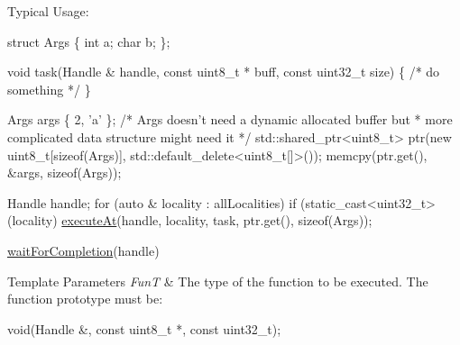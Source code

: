 Typical Usage\-: 
\begin{DoxyCode}
\textcolor{keyword}{struct }Args \{
  \textcolor{keywordtype}{int} a;
  \textcolor{keywordtype}{char} b;
\};

\textcolor{keywordtype}{void} task(Handle & handle,
          \textcolor{keyword}{const} uint8\_t * buff,
          \textcolor{keyword}{const} uint32\_t size) \{  \textcolor{comment}{/* do something */} \}

Args args \{ 2, \textcolor{charliteral}{'a'} \};
\textcolor{comment}{/* Args doesn't need a dynamic allocated buffer but}
\textcolor{comment}{ * more complicated data structure might need it */}
std::shared\_ptr<uint8\_t> ptr(\textcolor{keyword}{new} uint8\_t[\textcolor{keyword}{sizeof}(Args)],
                             std::default\_delete<uint8\_t[]>());
memcpy(ptr.get(), &args, \textcolor{keyword}{sizeof}(Args));

Handle handle;
\textcolor{keywordflow}{for} (\textcolor{keyword}{auto} & locality : allLocalities)
  \textcolor{keywordflow}{if} (static\_cast<uint32\_t>(locality) %
    \hyperlink{namespaceshad_1_1rt_ae4b428e7e47fc07e01707b3abb01caa2}{executeAt}(handle, locality, task, ptr.get(), \textcolor{keyword}{sizeof}(Args));

\hyperlink{namespaceshad_1_1rt_a6ea1d3672bac3a80032863b6732a0c0a}{waitForCompletion}(handle)
\end{DoxyCode}



\begin{DoxyTemplParams}{Template Parameters}
{\em Fun\-T} & The type of the function to be executed. The function prototype must be\-: 
\begin{DoxyCode}
void(Handle &, \textcolor{keyword}{const} uint8\_t *, \textcolor{keyword}{const} uint32\_t);
\end{DoxyCode}
\\
\hline
\end{DoxyTemplParams}

